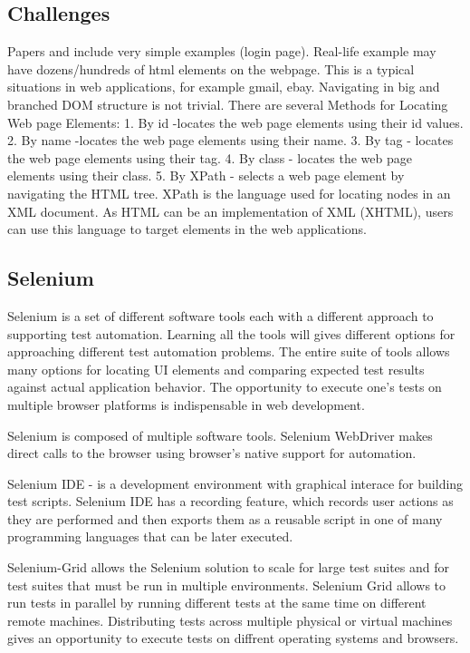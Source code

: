 \documentclass{article}
\begin{document}
	\subsection {Challenges}
		Papers \cite{Xu1} \cite{Zhongen2} and \cite{testGen3} include very simple examples
		(login page). Real-life example may have dozens/hundreds of html elements on the webpage. This is a typical
		situations in web applications, for example gmail, ebay. Navigating in big and
		branched DOM structure is not trivial. 
		There are several Methods for Locating Web page Elements:
			1. By id -locates the web page elements using their id values.
			2. By name -locates the web page elements using their name.
			3. By tag - locates the web page elements using their tag.
			4. By class - locates the web page elements using their class. 
			5. By XPath - selects a web page element by navigating the HTML tree.
		XPath is the language used for locating nodes in an XML document. As HTML can
		be an implementation of XML (XHTML), users can use this language to target
		elements in the web applications.	  
   	
   	\subsection {Selenium}
      Selenium is a set of different software tools each with a different approach
       to supporting test automation. Learning all the tools will gives different options for approaching different 
       test automation problems. The entire suite of tools allows many options for locating UI
       elements and comparing expected test results against actual application behavior.
       The opportunity to execute one’s tests on multiple browser platforms is indispensable
       in web development. 
       
       Selenium is composed of multiple software tools.
       Selenium  WebDriver makes direct calls to the browser using browser’s native support for automation.
       
       Selenium IDE - is a development environment with graphical interace for
       building test scripts.
       Selenium IDE has a recording feature, which records user actions as they are performed and
       then exports them as a reusable script in one of many programming languages that can be later executed.
       
       Selenium-Grid allows the Selenium solution to scale for large test
       suites and for test suites that must be run in multiple environments. 
       Selenium Grid allows to run tests in parallel by running different tests
       at the same time on different remote machines. Distributing tests across
       multiple physical or virtual machines gives an opportunity to execute
       tests on diffrent operating systems and browsers. 
         
\end{document}
